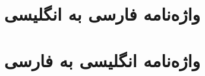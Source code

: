 \documentclass[12pt]{report}
\begin{document}


\newpage
\pagestyle{plain}
\setcounter{page}{1}


\tableofcontents

\newpage
\pagestyle{plain}
\setcounter{page}{1}


\chapter*{واژه‌نامه فارسی به انگلیسی}
\chapter*{ واژه‌نامه انگلیسی به فارسی}

\begin{thebibliography}{MM}
\end{thebibliography}

\newpage

\end{document}

